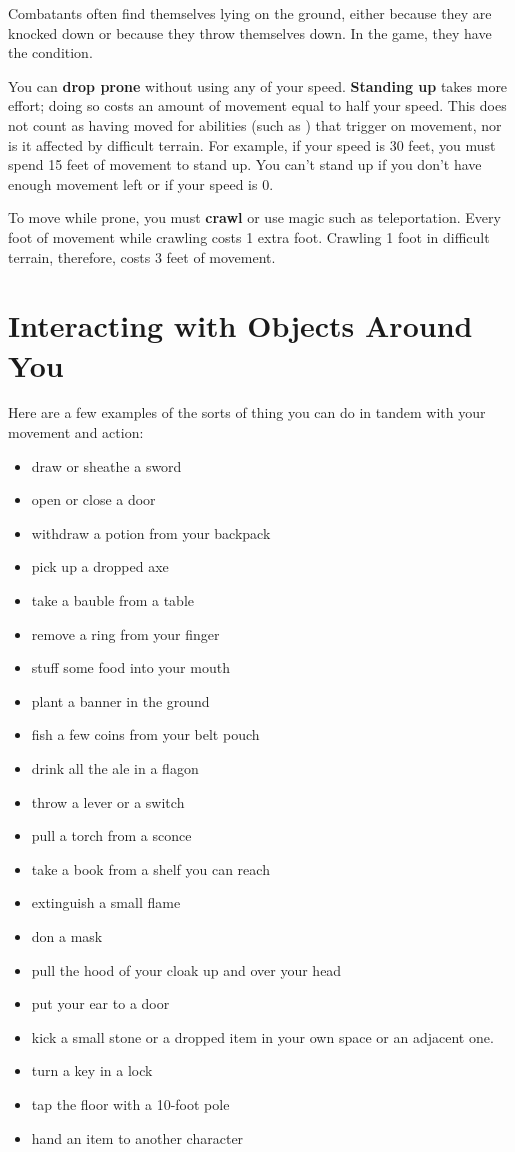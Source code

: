 Combatants often find themselves lying on the ground, either because they are knocked down or because they throw themselves down. In the game, they have the  condition.

You can \textbf{drop prone} without using any of your speed. \textbf{Standing up} takes more effort; doing so costs an amount of movement equal to half your speed. This does not count as having moved for abilities (such as ) that trigger on movement, nor is it affected by difficult terrain. For example, if your speed is 30 feet, you must spend 15 feet of movement to stand up. You can't stand up if you don't have enough movement left or if your speed is 0.

To move while prone, you must \textbf{crawl} or use magic such as teleportation. Every foot of movement while crawling costs 1 extra foot. Crawling 1 foot in difficult terrain, therefore, costs 3 feet of movement.

\section{Interacting with Objects Around You}

Here are a few examples of the sorts of thing you can do in tandem with your movement and action:

\begin{itemize}
\item draw or sheathe a sword
\item open or close a door
\item withdraw a potion from your backpack
\item pick up a dropped axe
\item take a bauble from a table
\item remove a ring from your finger
\item stuff some food into your mouth
\item plant a banner in the ground
\item fish a few coins from your belt pouch
\item drink all the ale in a flagon
\item throw a lever or a switch
\item pull a torch from a sconce
\item take a book from a shelf you can reach
\item extinguish a small flame
\item don a mask
\item pull the hood of your cloak up and over your head
\item put your ear to a door
\item kick a small stone or a dropped item in your own space or an adjacent one.
\item turn a key in a lock
\item tap the floor with a 10-foot pole
\item hand an item to another character
\end{itemize}

